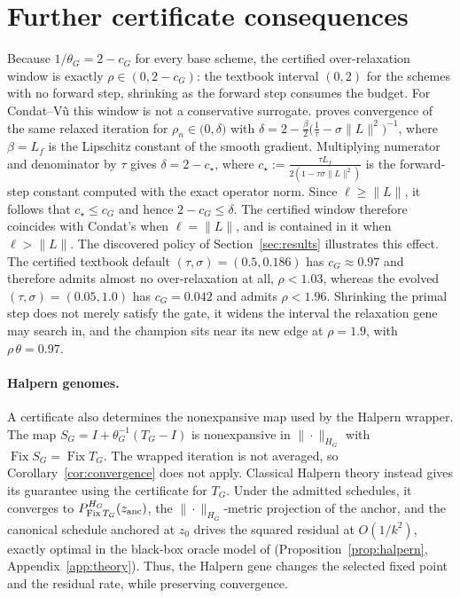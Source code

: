 \section{Further certificate consequences}
\label{app:theory-discussion}

\begin{remark}
\label{rem:relaxation-window-details}
Because $1/\theta_G=2-c_G$ for every base scheme, the certified
over-relaxation window is exactly $\rho\in(0,2-c_G)$: the textbook interval
$(0,2)$ for the schemes with no forward step, shrinking as the forward step
consumes the budget. For Condat--V\~u this window is not a conservative
surrogate. \citet[Theorem~3.1]{Condat2013Primal} proves convergence of the
same relaxed iteration for
$\rho_n\in\bigl(0,\delta\bigr)$ with
$\delta=2-\frac{\beta}{2}\bigl(\frac1\tau-\sigma\|L\|^2\bigr)^{-1}$, where
$\beta=L_f$ is the Lipschitz constant of the smooth gradient. Multiplying
numerator and denominator by $\tau$ gives
$\delta=2-c_\star$, where
$c_\star:=\frac{\tau L_f}{2(1-\tau\sigma\|L\|^2)}$ is the forward-step
constant computed with the exact operator norm. Since $\ell\geq\|L\|$, it follows
that $c_\star\leq c_G$ and hence $2-c_G\leq\delta$. The certified window
therefore coincides with Condat's when $\ell=\|L\|$, and is contained in it
when $\ell>\|L\|$. The discovered policy of Section~\ref{sec:results}
illustrates this effect. The certified textbook default
$(\tau,\sigma)=(0.5,0.186)$ has $c_G\approx0.97$ and therefore admits almost
no over-relaxation at all, $\rho<1.03$, whereas the evolved
$(\tau,\sigma)=(0.05,1.0)$ has $c_G=0.042$ and admits $\rho<1.96$. Shrinking
the primal step does not merely satisfy the gate, it widens the interval the
relaxation gene may search in, and the champion sits near its new edge at
$\rho=1.9$, with $\rho\,\theta=0.97$.
\end{remark}

\paragraph{Halpern genomes.}
A certificate also determines the nonexpansive map used by the Halpern
wrapper. The map $S_G=I+\theta_G^{-1}(T_G-I)$ is nonexpansive in
$\|\cdot\|_{H_G}$
with $\operatorname{Fix}S_G=\operatorname{Fix}T_G$. The wrapped iteration is
not averaged, so Corollary~\ref{cor:convergence} does not apply. Classical
Halpern theory instead gives its guarantee using the certificate for $T_G$.
Under the admitted schedules, it converges to
$P^{H_G}_{\operatorname{Fix}T_G}(z_{\rm anc})$, the $\|\cdot\|_{H_G}$-metric
projection of the anchor, and the canonical schedule anchored at $z_0$ drives
the squared residual at $O(1/k^2)$, exactly optimal in the black-box oracle
model of \citet{ParkRyu2022Exact}
(Proposition~\ref{prop:halpern}, Appendix~\ref{app:theory}). Thus, the
Halpern gene changes the selected fixed point and the residual rate, while
preserving convergence.

